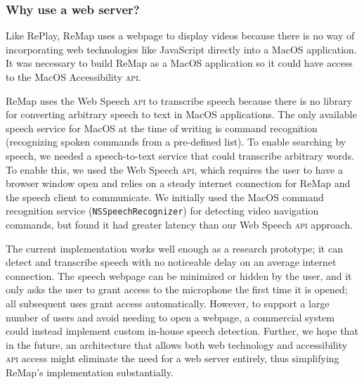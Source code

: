 \subsubsection{Why use a web server?}
Like RePlay, ReMap uses a webpage to display videos because there is no way of incorporating web technologies like JavaScript directly into a MacOS application. It was necessary to build ReMap as a MacOS application so it could have access to the MacOS Accessibility \textsc{api}. 

ReMap uses the Web Speech \textsc{api} to transcribe speech because there is no library for converting arbitrary speech to text in MacOS applications. The only available speech service for MacOS at the time of writing is command recognition (recognizing spoken commands from a pre-defined list). To enable searching by speech, we needed a speech-to-text service that could transcribe arbitrary words. To enable this, we used the Web Speech \textsc{api}, which requires the user to have a browser window open and relies on a steady internet connection for ReMap and the speech client to communicate. We initially used the MacOS command recognition service (\texttt{NSSpeechRecognizer}) for detecting video navigation commands, but found it had greater latency than our Web Speech \textsc{api} approach.

The current implementation works well enough as a research prototype; it can detect and transcribe speech with no noticeable delay on an average internet connection. The speech webpage can be minimized or hidden by the user, and it only asks the user to grant access to the microphone the first time it is opened; all subsequent uses grant access automatically. However, to support a large number of users and avoid needing to open a webpage, a commercial system could instead implement custom in-house speech detection. Further, we hope that in the future, an architecture that allows both web technology and accessibility \textsc{api} access might eliminate the need for a web server entirely, thus simplifying ReMap's implementation substantially. 






